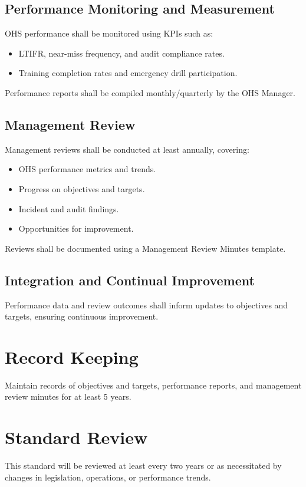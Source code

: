 \documentclass[12pt]{article}
\begin{document}
\subsection{Performance Monitoring and Measurement}
OHS performance shall be monitored using KPIs such as:
\begin{itemize}
    \item LTIFR, near-miss frequency, and audit compliance rates.
    \item Training completion rates and emergency drill participation.
\end{itemize}
Performance reports shall be compiled monthly/quarterly by the OHS Manager.

\subsection{Management Review}
Management reviews shall be conducted at least annually, covering:
\begin{itemize}
    \item OHS performance metrics and trends.
    \item Progress on objectives and targets.
    \item Incident and audit findings.
    \item Opportunities for improvement.
\end{itemize}
Reviews shall be documented using a Management Review Minutes template.

\subsection{Integration and Continual Improvement}
Performance data and review outcomes shall inform updates to objectives and targets, ensuring continuous improvement.

\section{Record Keeping}
Maintain records of objectives and targets, performance reports, and management review minutes for at least 5 years.

\section{Standard Review}
This standard will be reviewed at least every two years or as necessitated by changes in legislation, operations, or performance trends.
\end{document}
